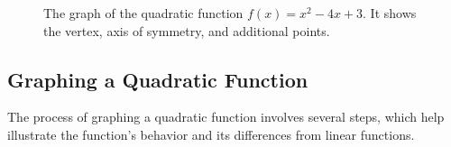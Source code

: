 \begin{figure}[h!]
    \centering
    \caption{The graph of the quadratic function \( f(x) = x^2 - 4x + 3 \). It shows the vertex, axis of symmetry, and additional points.}
\end{figure}

\subsection{Graphing a Quadratic Function}

The process of graphing a quadratic function involves several steps, which help illustrate the function's behavior and its differences from linear functions.

